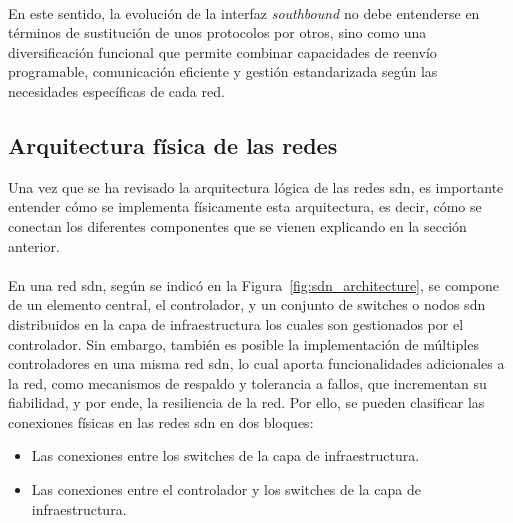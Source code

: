 \\
En este sentido, la evolución de la interfaz \textit{southbound} no debe entenderse en términos de sustitución de unos protocolos por otros, sino como una diversificación funcional que permite combinar capacidades de reenvío programable, comunicación eficiente y gestión estandarizada según las necesidades específicas de cada red.


\subsection{Arquitectura física de las redes }
\label{subsec:arquitectura_fisica_sdn}

Una vez que se ha revisado la arquitectura lógica de las redes \gls{sdn}, es importante entender cómo se implementa físicamente esta arquitectura, es decir, cómo se conectan los diferentes componentes que se vienen explicando en la sección anterior.\\
\\
En una red \gls{sdn}, según se indicó en la Figura~\ref{fig:sdn_architecture}, se compone de un elemento central, el controlador, y un conjunto de switches o nodos \gls{sdn} distribuidos en la capa de infraestructura los cuales son gestionados por el controlador. Sin embargo, también es posible la implementación de múltiples controladores en una misma red \gls{sdn}, lo cual aporta funcionalidades adicionales a la red, como mecanismos de respaldo y tolerancia a fallos, que incrementan su fiabilidad, y por ende, la resiliencia de la red. Por ello, se pueden clasificar las conexiones físicas en las redes \gls{sdn} en dos bloques:  

\begin{itemize}
    \item Las conexiones entre los switches de la capa de infraestructura.
    \item Las conexiones entre el controlador y los switches de la capa de infraestructura.
\end{itemize}
 
